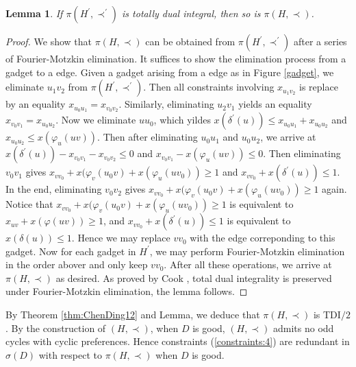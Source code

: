 \documentclass[11pt]{article}
\newtheorem{lemma}[theorem]{Lemma}
\numberwithin{theorem}{section}
\begin{document}
\begin{lemma}
  If $\pi(H^\prime,\prec^\prime)$ is  totally dual integral, then so is $\pi(H,\prec)$.
\end{lemma}
\begin{proof}
  We show that $\pi(H,\prec)$ can be obtained from $\pi(H^\prime,\prec^\prime)$ after a series of Fourier-Motzkin elimination.
  It suffices to show the elimination process from a gadget to a edge.
  Given a gadget arising from a edge as in Figure \ref{gadget}, we eliminate $u_1 v_2$ from $\pi(H^\prime, \prec^\prime)$. Then all constraints involving $x_{u_1 v_2}$ is replace by an equality $x_{u_0 u_1}=x_{v_0 v_2}$.
  Similarly, eliminating $u_2 v_1$ yields an equality $x_{v_0 v_1}=x_{u_0 u_2}$.
  Now we eliminate $u u_0$, which yildes $x(\delta^\prime(u))\leq x_{u_0 u_1}+x_{u_0 u_2}$ and $x_{u_0 u_2}\leq x(\varphi_u(uv))$.
  Then after eliminating $u_0 u_1$ and $u_0 u_2$, we arrive at $x(\delta^\prime(u))-x_{v_0 v_1}-x_{v_0 v_2}\leq 0$ and $x_{v_0 v_1}-x(\varphi_u(uv))\leq 0$.
  Then eliminating $v_0 v_1$ gives $x_{v v_0}+x(\varphi_v(u_0 v)+x(\varphi_u(u v_0))\geq 1$ and $x_{v v_0}+x(\delta^\prime(u))\leq 1$.
  In the end, eliminating $v_0 v_2$ gives $x_{v v_0}+x(\varphi_v(u_0 v)+x(\varphi_u(u v_0))\geq 1$ again.
  Notice that $x_{v v_0}+x(\varphi_v(u_0 v)+x(\varphi_u(u v_0))\geq 1$  is equivalent to $x_{uv}+x(\varphi(uv))\geq 1$,
  and $x_{v v_0}+x(\delta^\prime(u))\leq 1$ is equivalent to $x(\delta(u))\leq 1$.
  Hence we may replace $v v_0$ with the edge correponding to this gadget.
  Now for each gadget in $H^\prime$, we may perform Fourier-Motzkin elimination in the order abover and only keep $v v_0$.
  After all these operations, we arrive at $\pi(H,\prec)$ as desired.
  As proved by Cook \cite{Cook83}, total dual integrality is preserved under Fourier-Motzkin elimination, the lemma follows.
\end{proof}

By Theorem \ref{thm:ChenDing12} and Lemma, we deduce that $\pi(H,\prec)$ is TDI$/2$. By the construction of $(H,\prec)$, when $D$ is good, $(H,\prec)$ admits no odd cycles with cyclic preferences. Hence constraints (\ref{constraints:4}) are redundant in $\sigma(D)$ with respect to $\pi(H,\prec)$ when $D$ is good.
\end{document}
